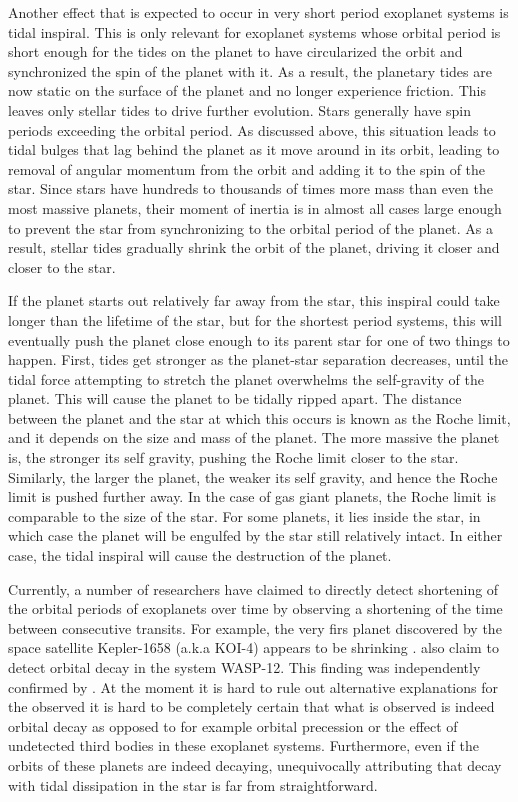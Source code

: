 Another effect that is expected to occur in very short period exoplanet systems
is tidal inspiral. This is only relevant for exoplanet systems whose orbital
period is short enough for the tides on the planet to have circularized the
orbit and synchronized the spin of the planet with it. As a result, the
planetary tides are now static on the surface of the planet and no longer
experience friction. This leaves only stellar tides to drive further evolution.
Stars generally have spin periods exceeding the orbital period. As discussed
above, this situation leads to tidal bulges that lag behind the planet as it
move around in its orbit, leading to removal of angular momentum from the orbit
and adding it to the spin of the star. Since stars have hundreds to thousands of
times more mass than even the most massive planets, their moment of inertia is
in almost all cases large enough to prevent the star from synchronizing to the
orbital period of the planet. As a result, stellar tides gradually shrink the
orbit of the planet, driving it closer and closer to the star.

If the planet starts out relatively far away from the star, this inspiral could
take longer than the lifetime of the star, but for the shortest period systems,
this will eventually push the planet close enough to its parent star for one of
two things to happen. First, tides get stronger as the planet-star separation
decreases, until the tidal force attempting to stretch the planet overwhelms the
self-gravity of the planet. This will cause the planet to be tidally ripped
apart. The distance between the planet and the star at which this occurs is
known as the Roche limit, and it depends on the size and mass of the planet. The
more massive the planet is, the stronger its self gravity, pushing the Roche
limit closer to the star.  Similarly, the larger the planet, the weaker its self
gravity, and hence the Roche limit is pushed further away. In the case of gas
giant planets, the Roche limit is comparable to the size of the star. For some
planets, it lies inside the star, in which case the planet will be engulfed by
the star still relatively intact. In either case, the tidal inspiral will cause
the destruction of the planet.

Currently, a number of researchers have claimed to directly detect shortening of
the orbital periods of exoplanets over time by observing a shortening of the
time between consecutive transits. For example, the very firs planet discovered
by the \kepler space satellite Kepler-1658 (a.k.a KOI-4) appears to be shrinking
\citep{Vissapragada_et_al_22}. \citet{Maciejewski_et_al_16} also claim to detect
orbital decay in the system WASP-12. This finding was independently confirmed by
\citet{Patra_et_al_17}. At the moment it is hard to rule out alternative
explanations for the observed it is hard to be completely certain that what is
observed is indeed orbital decay as opposed to for example orbital precession or
the effect of undetected third bodies in these exoplanet systems. Furthermore,
even if the orbits of these planets are indeed decaying, unequivocally
attributing that decay with tidal dissipation in the star is far from
straightforward.

